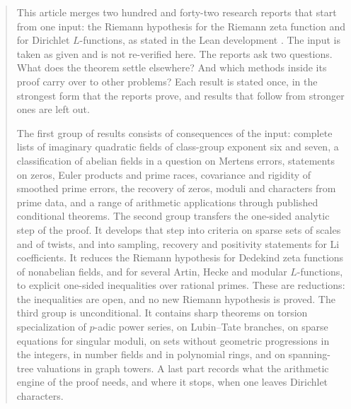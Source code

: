 \begin{abstract}
This article merges two hundred and forty-two research reports that start from one input: the Riemann
hypothesis for the Riemann zeta function and for Dirichlet $L$-functions, as stated in the
Lean development \repo. The input is taken as given and is not re-verified here. The
reports ask two questions. What does the theorem settle elsewhere? And which methods inside
its proof carry over to other problems? Each result is stated once, in the strongest form
that the reports prove, and results that follow from stronger ones are left out.

The first group of results consists of consequences of the input: complete lists of
imaginary quadratic fields of class-group exponent six and seven, a classification of abelian
fields in a question on Mertens errors, statements on zeros, Euler products and prime races,
covariance and rigidity of smoothed prime errors, the recovery of zeros, moduli and
characters from prime data, and a range of arithmetic applications through published
conditional theorems. The second group transfers the one-sided analytic step of the proof.
It develops that step into criteria on sparse sets of scales and of twists, and into
sampling, recovery and positivity statements for Li coefficients. It reduces the Riemann hypothesis
for Dedekind zeta functions of nonabelian fields, and for several Artin, Hecke and modular
$L$-functions, to explicit one-sided inequalities over rational primes. These are
reductions: the inequalities are open, and no new Riemann hypothesis is proved. The third
group is unconditional. It contains sharp theorems on torsion specialization of $p$-adic
power series, on Lubin--Tate branches, on sparse equations for singular moduli, on sets
without geometric progressions in the integers, in number fields and in polynomial rings, and
on spanning-tree valuations in graph towers. A last part records what the arithmetic engine
of the proof needs, and where it stops, when one leaves Dirichlet characters.
\end{abstract}
